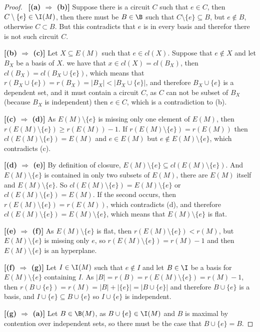 \begin{proof}
    $\,$\pn
    \textbf{[(a) $\Rightarrow$ (b)]} \pn
        Suppose there is a circuit $C$ such that $e \in C$, then $C \setminus \{ e \} \in \I(M)$, then
        there must be $B \in \B$ such that $C \setminus \{ e \} \subseteq B$, but $e \not\in B$, otherwise
        $C \subset B$. But this contradicts that $e$ is in every basis and therefor there is not such 
        circuit $C$.\pn
        
    \textbf{[(b) $\Rightarrow$ (c)]} \pn
        Let $X \subseteq E(M)$ such that $e \in cl(X)$. Suppose that $e \notin X$ and let $B_X$ be a basis of $X$.
        we have that $x \in cl(X) = cl(B_X)$, then $cl(B_X) = cl(B_X \cup \{ e \})$, which means that
        $r(B_X \cup \{ e \}) = r(B_X) = |B_X| < |B_X \cup \{ e \}|$, and therefore $B_X \cup \{ e \}$ is a dependent set,
        and it must contain a circuit $C$, as $C$ can not be subset of $B_X$ (because $B_X$ is independent) then $e \in C$,
        which is a contradiction to (b).\pn

    
    \textbf{[(c) $\Rightarrow$ (d)]} \pn
        As $E(M) \setminus \{e\}$ is missing only one element of $E(M)$, then $r(E(M) \setminus \{e\}) \geq r(E(M)) - 1$.
        If $r(E(M) \setminus \{e\}) = r(E(M))$ then $cl(E(M) \setminus \{e\}) = E(M)$ and $e \in E(M)$ but $e \notin E(M) \setminus \{e\}$,
        which contradicts (c).\pn
        
    \textbf{[(d) $\Rightarrow$ (e)]} \pn
        By definition of closure, $E(M) \setminus \{ e \} \subseteq cl(E(M) \setminus \{ e \})$. And $E(M) \setminus \{ e \}$ is contained in only
        two subsets of $E(M)$, there are $E(M)$ itself and $E(M) \setminus \{ e \}$. So $cl(E(M) \setminus \{ e \}) = E(M) \setminus \{ e \}$ or
        $cl(E(M) \setminus \{ e \}) = E(M)$. If the second occurs, then $r(E(M) \setminus \{ e \}) = r(E(M))$, which contradicts (d), and therefore
        $cl(E(M) \setminus \{ e \}) = E(M) \setminus \{ e \}$, which means that $E(M) \setminus \{ e \}$ is flat.\pn
        
    \textbf{[(e) $\Rightarrow$ (f)]} \pn
        As $E(M) \setminus \{ e \}$ is flat, then $r(E(M) \setminus \{ e \}) < r(M)$, but $E(M) \setminus \{ e \}$ is missing only $e$, so 
        $r(E(M) \setminus \{ e \}) = r(M) - 1$ and then $E(M) \setminus \{ e \}$ is an hyperplane.\pn
        
    \textbf{[(f) $\Rightarrow$ (g)]} \pn
        Let $I \in \I(M)$ such that $e \notin I$ and let $B \in \I$ be a basis for $E(M) \setminus \{ e \}$ containing $I$. 
        As $|B| = r(B) = r(E(M) \setminus \{ e \}) = r(M) - 1$, then $r(B \cup \{ e \}) = r(M) = |B| + |\{ e \}| = |B \cup \{ e \}|$ and therefore
        $B \cup \{e\}$ is a basis, and $I \cup \{ e \} \subseteq B \cup \{ e \}$ so $I \cup \{e\}$ is independent.

    \textbf{[(g) $\Rightarrow$ (a)]} \pn
        Let $B \in \B(M)$, as $B \cup \{ e \} \in \I(M)$ and $B$ is maximal by contention over independent sets, so there must be the case that
        $B \cup  \{ e \} = B$.        
\end{proof}
